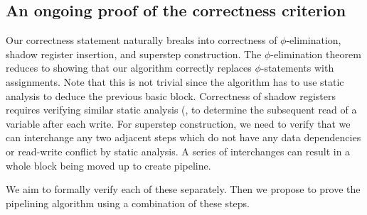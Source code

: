 \medskip
\subsection{An ongoing proof of the correctness criterion}
\label{sec:proof}	
Our correctness statement naturally breaks into correctness of $\phi$-elimination, shadow register insertion, and superstep construction.
The $\phi$-elimination theorem reduces to showing that our
algorithm correctly replaces $\phi$-statements with
assignments.  Note that this is not trivial since the algorithm has to use static analysis to
deduce the previous basic block.  Correctness of shadow
registers requires verifying similar static
analysis (\eg, to determine the subsequent read of a
variable after each write. For superstep construction, we need to verify that we can interchange any two adjacent steps which do not have any data dependencies or read-write conflict by static analysis. A series of interchanges can result in a whole block being moved up to create pipeline. 

We aim to formally verify each of these separately. Then we propose to prove the pipelining algorithm using a combination of these steps.

